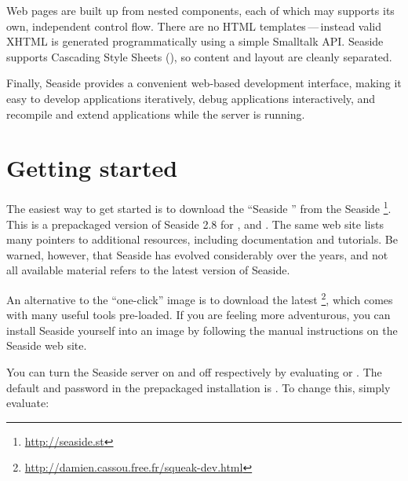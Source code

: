 \documentclass[a4paper,10pt,twoside]{book}
\begin{document}
Web pages are built up from nested components, each of which may supports its own, independent control flow.
There are no HTML templates\,---\,instead valid XHTML is generated programmatically using a simple Smalltalk API.
Seaside supports Cascading Style Sheets (), so content and layout are cleanly separated.

Finally, Seaside provides a convenient web-based development interface, making it easy to develop applications iteratively, debug applications interactively, and recompile and extend applications while the server is running.

\section{Getting started}

The easiest way to get started is to download the ``Seaside '' from the Seaside \footnote{\url{http://seaside.st}}.
This is a prepackaged version of Seaside 2.8 for ,  and .
The same web site lists many pointers to additional resources, including documentation and tutorials.
Be warned, however, that Seaside has evolved considerably over the years, and not all available material refers to the latest version of Seaside.

An alternative to the ``one-click'' image is to download the latest \footnote{\url{http://damien.cassou.free.fr/squeak-dev.html}}, which comes with many useful tools pre-loaded.
If you are feeling more adventurous, you can install Seaside yourself into an image by following the manual  instructions on the Seaside web site.

You can turn the Seaside server on and off respectively by evaluating
 
or
.
The default  and password in the prepackaged installation is .
To change this, simply evaluate:  
\end{document}
